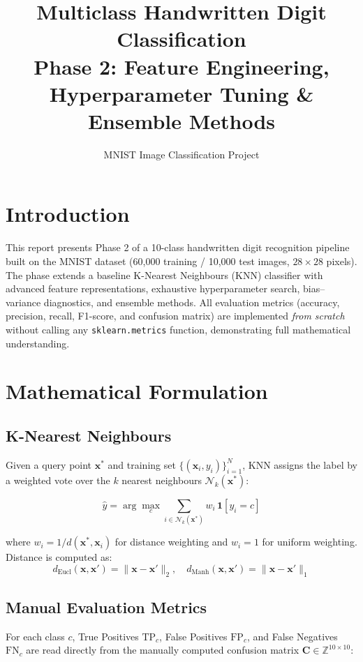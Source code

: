\documentclass[10pt,twocolumn]{article}
\title{\textbf{Multiclass Handwritten Digit Classification\\
\large Phase 2: Feature Engineering, Hyperparameter Tuning \& Ensemble Methods}}
\author{MNIST Image Classification Project}
\date{}
\begin{document}
\maketitle
\thispagestyle{empty}

\section{Introduction}
This report presents Phase 2 of a 10-class handwritten digit recognition pipeline
built on the MNIST dataset (60{,}000 training / 10{,}000 test images, $28\times28$ pixels).
The phase extends a baseline K-Nearest Neighbours (KNN) classifier with advanced
feature representations, exhaustive hyperparameter search, bias–variance diagnostics,
and ensemble methods.  All evaluation metrics (accuracy, precision, recall, F1-score,
and confusion matrix) are implemented \emph{from scratch} without calling any
\texttt{sklearn.metrics} function, demonstrating full mathematical understanding.

\section{Mathematical Formulation}

\subsection{K-Nearest Neighbours}
Given a query point $\mathbf{x}^*$ and training set
$\{(\mathbf{x}_i, y_i)\}_{i=1}^{N}$, KNN assigns the label by a weighted vote
over the $k$ nearest neighbours $\mathcal{N}_k(\mathbf{x}^*)$:

\begin{equation}
\hat{y} = \arg\max_{c}\sum_{i \in \mathcal{N}_k(\mathbf{x}^*)} w_i \,\mathbf{1}[y_i = c]
\end{equation}

\noindent where $w_i = 1/d(\mathbf{x}^*, \mathbf{x}_i)$ for distance weighting and
$w_i = 1$ for uniform weighting. Distance is computed as:
\begin{equation}
d_{\text{Eucl}}(\mathbf{x}, \mathbf{x}') = \|\mathbf{x} - \mathbf{x}'\|_2,\quad
d_{\text{Manh}}(\mathbf{x}, \mathbf{x}') = \|\mathbf{x} - \mathbf{x}'\|_1
\end{equation}

\subsection{Manual Evaluation Metrics}
For each class $c$, True Positives $\text{TP}_c$, False Positives $\text{FP}_c$,
and False Negatives $\text{FN}_c$ are read directly from the manually computed
confusion matrix $\mathbf{C}\in\mathbb{Z}^{10\times10}$:
\end{document}
